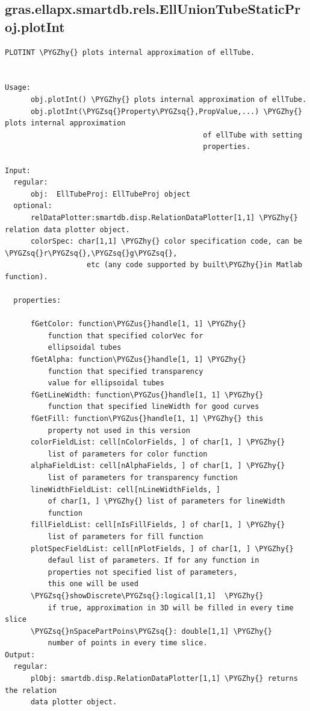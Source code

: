 \documentclass[letterpaper,10pt,english]{sphinxmanual}
\def\PYGZus{\char`\_}
\def\PYGZhy{\char`\-}
\def\PYGZsq{\char`\'}
\begin{document}
\subsection{gras.ellapx.smartdb.rels.EllUnionTubeStaticProj.plotInt}
\label{chap_functions:gras-ellapx-smartdb-rels-elluniontubestaticproj-plotint}
\begin{Verbatim}[commandchars=\\\{\}]
PLOTINT \PYGZhy{} plots internal approximation of ellTube.


Usage:
      obj.plotInt() \PYGZhy{} plots internal approximation of ellTube.
      obj.plotInt(\PYGZsq{}Property\PYGZsq{},PropValue,...) \PYGZhy{} plots internal approximation
                                              of ellTube with setting
                                              properties.

Input:
  regular:
      obj:  EllTubeProj: EllTubeProj object
  optional:
      relDataPlotter:smartdb.disp.RelationDataPlotter[1,1] \PYGZhy{} relation data plotter object.
      colorSpec: char[1,1] \PYGZhy{} color specification code, can be \PYGZsq{}r\PYGZsq{},\PYGZsq{}g\PYGZsq{},
                   etc (any code supported by built\PYGZhy{}in Matlab function).

  properties:

      fGetColor: function\PYGZus{}handle[1, 1] \PYGZhy{}
          function that specified colorVec for
          ellipsoidal tubes
      fGetAlpha: function\PYGZus{}handle[1, 1] \PYGZhy{}
          function that specified transparency
          value for ellipsoidal tubes
      fGetLineWidth: function\PYGZus{}handle[1, 1] \PYGZhy{}
          function that specified lineWidth for good curves
      fGetFill: function\PYGZus{}handle[1, 1] \PYGZhy{} this
          property not used in this version
      colorFieldList: cell[nColorFields, ] of char[1, ] \PYGZhy{}
          list of parameters for color function
      alphaFieldList: cell[nAlphaFields, ] of char[1, ] \PYGZhy{}
          list of parameters for transparency function
      lineWidthFieldList: cell[nLineWidthFields, ]
          of char[1, ] \PYGZhy{} list of parameters for lineWidth
          function
      fillFieldList: cell[nIsFillFields, ] of char[1, ] \PYGZhy{}
          list of parameters for fill function
      plotSpecFieldList: cell[nPlotFields, ] of char[1, ] \PYGZhy{}
          defaul list of parameters. If for any function in
          properties not specified list of parameters,
          this one will be used
      \PYGZsq{}showDiscrete\PYGZsq{}:logical[1,1]  \PYGZhy{}
          if true, approximation in 3D will be filled in every time slice
      \PYGZsq{}nSpacePartPoins\PYGZsq{}: double[1,1] \PYGZhy{}
          number of points in every time slice.
Output:
  regular:
      plObj: smartdb.disp.RelationDataPlotter[1,1] \PYGZhy{} returns the relation
      data plotter object.
\end{Verbatim}
\end{document}
